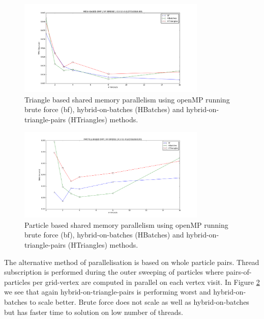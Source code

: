 \begin{figure}[htb]
  \begin{center}
    \includegraphics[width=0.8\textwidth]{experiments/random/omp/triangle_based_x0.png}
  \end{center}
  \caption{Triangle based shared memory parallelism using openMP running brute force (bf), hybrid-on-batches (HBatches) and hybrid-on-triangle-pairs (HTriangles) methods.}
  \label{figure:triangle_omp}
\end{figure}

\begin{figure}[htb]
  \begin{center}
    \includegraphics[width=0.8\textwidth]{experiments/random/omp/particle_based_x0.png}
  \end{center}
  \caption{Particle based shared memory parallelism using openMP running brute force (bf), hybrid-on-batches (HBatches) and hybrid-on-triangle-pairs (HTriangles) methods.}
  \label{figure:particle_omp}
\end{figure}

The alternative method of parallelisation is based on whole particle pairs. Thread subscription is performed during the outer sweeping of particles where pairs-of-particles per grid-vertex are computed in parallel on each vertex visit. In Figure \ref{figure:particle_omp} we see that again hybrid-on-triangle-pairs is performing worst and hybrid-on-batches to scale better. Brute force does not scale as well as hybrid-on-batches but has faster time to solution on low number of threads.

